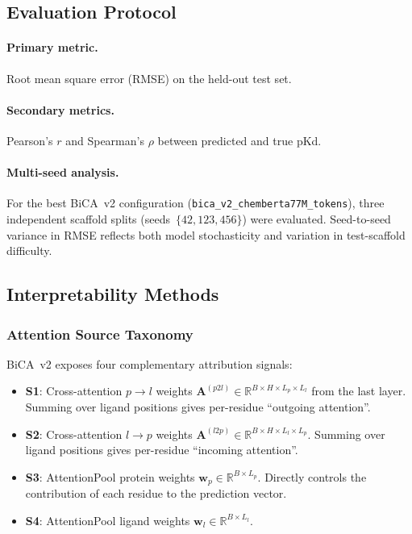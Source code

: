 \documentclass[11pt,twocolumn]{article}
\begin{document}
\subsection{Evaluation Protocol}

\paragraph{Primary metric.}
Root mean square error (RMSE) on the held-out test set.

\paragraph{Secondary metrics.}
Pearson's $r$ and Spearman's $\rho$ between predicted and true pKd.

\paragraph{Multi-seed analysis.}
For the best BiCA~v2 configuration
(\texttt{bica\_v2\_chemberta77M\_tokens}), three independent scaffold splits
(seeds~$\{42, 123, 456\}$) were evaluated.  Seed-to-seed variance in RMSE
reflects both model stochasticity and variation in test-scaffold difficulty.

\subsection{Interpretability Methods}

\subsubsection{Attention Source Taxonomy}

BiCA~v2 exposes four complementary attribution signals:
\begin{itemize}
  \item \textbf{S1}: Cross-attention $p\to l$ weights
    $\mathbf{A}^{(p2l)} \in \mathbb{R}^{B \times H \times L_p \times L_l}$
    from the last layer.  Summing over ligand positions gives per-residue
    ``outgoing attention''.
  \item \textbf{S2}: Cross-attention $l\to p$ weights
    $\mathbf{A}^{(l2p)} \in \mathbb{R}^{B \times H \times L_l \times L_p}$.
    Summing over ligand positions gives per-residue ``incoming attention''.
  \item \textbf{S3}: AttentionPool protein weights
    $\mathbf{w}_p \in \mathbb{R}^{B \times L_p}$.  Directly controls the
    contribution of each residue to the prediction vector.
  \item \textbf{S4}: AttentionPool ligand weights
    $\mathbf{w}_l \in \mathbb{R}^{B \times L_l}$.
\end{itemize}
\end{document}
